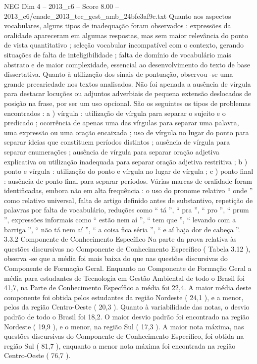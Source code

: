 \begin{textsample}{NEG Dim 4 – 2013\_c6 – Score 8.00 – 2013\_c6/enade\_2013\_tec\_gest\_amb\_24bfe3af9c.txt}
Quanto aos aspectos vocabulares, alguns tipos de inadequação foram observados : expressões da oralidade apareceram em algumas respostas, mas sem maior relevância do ponto de vista quantitativo ; seleção vocabular incompatível com o contexto, gerando situações de falta de inteligibilidade ; falta de domínio de vocabulário mais abstrato e de maior complexidade, essencial ao desenvolvimento do texto de base dissertativa.
Quanto à utilização dos sinais de pontuação, observou -se uma grande precariedade nos textos analisados.
Não foi apenada a ausência de vírgula para destacar locuções ou adjuntos adverbiais de pequena extensão deslocados de posição na frase, por ser um uso opcional.
São os seguintes os tipos de problemas encontrados : a ) vírgula : utilização de vírgula para separar o sujeito e o predicado ; ocorrência de apenas uma das vírgulas para separar uma palavra, uma expressão ou uma oração encaixada ; uso de vírgula no lugar do ponto para separar ideias que constituem períodos distintos ; ausência de vírgula para separar enumerações ; ausência de vírgula para separar oração adjetiva explicativa ou utilização inadequada para separar oração adjetiva restritiva ; b ) ponto e vírgula : utilização do ponto e vírgula no lugar de vírgula ; c ) ponto final : ausência de ponto final para separar períodos.
Várias marcas de oralidade foram identificadas, embora não em alta frequência : o uso do pronome relativo “ onde ” como relativo universal, falta de artigo definido antes de substantivo, repetição de palavras por falta de vocabulário, reduções como “ tá ”, “ pra ”, “ pro ”, “ prum ”, expressões informais como “ estão nem aí ”, “ tem que ”, “ levando com a barriga ”, “ não tá nem aí ”, “ a coisa fica séria ”, “ e aí haja dor de cabeça ”. 3.3.2 Componente de Conhecimento Específico Na parte da prova relativa às questões discursivas no Componente de Conhecimento Específico ( Tabela 3.12 ), observa -se que a média foi mais baixa do que nas questões discursivas do Componente de Formação Geral.
Enquanto no Componente de Formação Geral a média para estudantes de Tecnologia em Gestão Ambiental de todo o Brasil foi 41,7, na Parte de Conhecimento Específico a média foi 22,4.
A maior média deste componente foi obtida pelos estudantes da região Nordeste ( 24,1 ), e a menor, pelos da região Centro-Oeste ( 20,3 ).
Quanto à variabilidade das notas, o desvio padrão de todo o Brasil foi 18,2.
O maior desvio padrão foi encontrado na região Nordeste ( 19,9 ), e o menor, na região Sul ( 17,3 ).
A maior nota máxima, nas questões discursivas do Componente de Conhecimento Específico, foi obtida na região Sul ( 81,7 ), enquanto a menor nota máxima foi encontrada na região Centro-Oeste ( 76,7 ).

\end{textsample}
